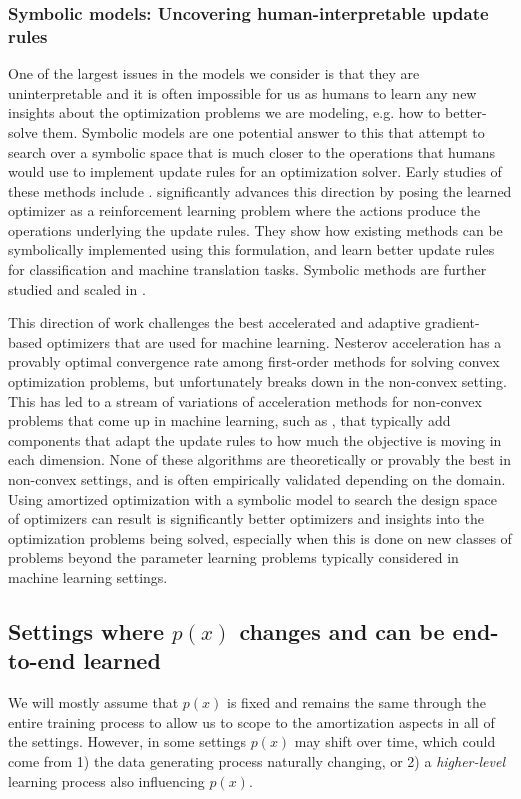 \documentclass[twoside,11pt]{article}
\newcommand{\eg}{e.g.\xspace}
\begin{document}
\subsubsection{Symbolic models: Uncovering human-interpretable update rules}
One of the largest issues in the models we consider
is that they are uninterpretable and it is often impossible
for us as humans to learn any new insights about the optimization
problems we are modeling, \eg how to better-solve them.
Symbolic models are one potential answer to this that attempt
to search over a symbolic space that is much closer to the
operations that humans would use to implement update rules for
an optimization solver.
Early studies of these methods include
\citet{bengio1994use,runarsson2000evolution}.
\citet{bello2017neural} significantly advances this direction
by posing the learned optimizer as a reinforcement learning problem
where the actions produce the operations underlying the update rules.
They show how existing methods can be symbolically implemented
using this formulation, and learn better update rules for
classification and machine translation tasks.
Symbolic methods are further studied and scaled in
\citet{real2020automl,zheng2022symbolic}.

This direction of work challenges the best accelerated and adaptive
gradient-based optimizers that are used for machine learning.
Nesterov acceleration \citep{nesterov1983method} has a provably
optimal convergence rate among first-order methods for solving
convex optimization problems, but unfortunately breaks down
in the non-convex setting.
This has led to a stream of variations of acceleration methods
for non-convex problems that come up in machine learning,
such as \citet{duchi2011adaptive,zeiler2012adadelta,kingma2014adam},
that typically add components that adapt the update rules to
how much the objective is moving in each dimension.
None of these algorithms are theoretically or provably the
best in non-convex settings, and is often empirically validated
depending on the domain.
Using amortized optimization with a symbolic model to search
the design space of optimizers can result is significantly
better optimizers and insights into the optimization problems
being solved, especially when this is done on new classes
of problems beyond the parameter learning problems typically
considered in machine learning settings.

\subsection{Settings where $p(x)$ changes and can be end-to-end learned}
We will mostly assume that $p(x)$ is fixed and remains
the same through the entire training process to allow us
to scope to the amortization aspects in all of the settings.
However, in some settings $p(x)$ may shift over time, which
could come from 1) the data generating process naturally
changing, or 2) a \emph{higher-level} learning process
also influencing $p(x)$.
\end{document}
